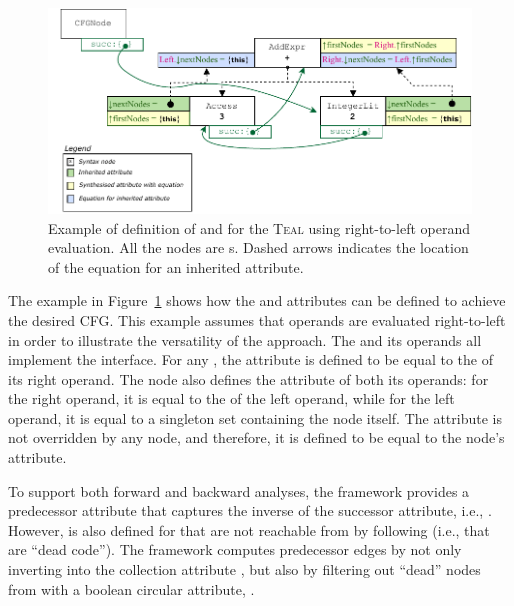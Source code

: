\begin{figure}[H]
    \centering
    \includegraphics[width=1\textwidth]{kappa/img/IntraCFGExample1.pdf}
    \caption{\label{fig:IntraCFGExample} Example of definition of   and  for the \textsc{Teal}  using right-to-left operand evaluation.
    All the nodes are s. Dashed arrows indicates the location of the equation for an inherited attribute.
    }
\end{figure}
The example in Figure~\ref{fig:IntraCFGExample} shows how the  and
 attributes can be defined to achieve the desired CFG.
This example assumes that operands are evaluated right-to-left in order to illustrate the versatility of the approach.
The  and its operands all implement the  interface.
For any , the  attribute is defined to
be equal to the  of its right operand. The  node
also defines the  attribute of both its operands:
for the right operand, it is equal to the  of the left operand,
while for the left operand, it is equal to a singleton set containing the  node itself.
The  attribute is not overridden by any node, and
therefore, it is defined to be equal to the node's  attribute.


To support both forward and backward analyses, the framework provides a predecessor
attribute that captures the inverse of the successor attribute, i.e., . However,
 is also defined for  that are not reachable from  by following
 (i.e., that are ``dead code''). The framework computes predecessor edges 
by not only inverting  into the collection attribute , but also by
filtering out ``dead'' nodes from  with a boolean circular attribute,
.

